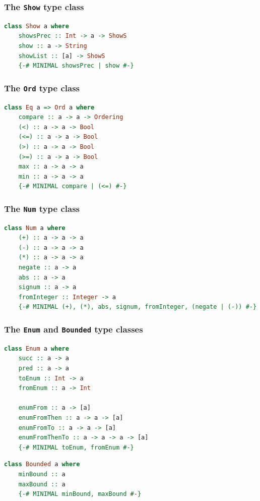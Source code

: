 \documentclass[10pt,pdf,utf8,russian,aspectratio=169]{beamer}
\begin{document}
\begin{frame}[fragile]
  \frametitle{The \verb"Show" type class}

  \begin{lstlisting}[language=Haskell]
  class Show a where
    showsPrec :: Int -> a -> ShowS
    show :: a -> String
    showList :: [a] -> ShowS
    {-# MINIMAL showsPrec | show #-}
  \end{lstlisting}
\end{frame}

\begin{frame}[fragile]
  \frametitle{The \verb"Ord" type class}

  \begin{lstlisting}[language=Haskell]
  class Eq a => Ord a where
    compare :: a -> a -> Ordering
    (<) :: a -> a -> Bool
    (<=) :: a -> a -> Bool
    (>) :: a -> a -> Bool
    (>=) :: a -> a -> Bool
    max :: a -> a -> a
    min :: a -> a -> a
    {-# MINIMAL compare | (<=) #-}
  \end{lstlisting}
\end{frame}

\begin{frame}[fragile]
  \frametitle{The \verb"Num" type class}

  \begin{lstlisting}[language=Haskell]
  class Num a where
    (+) :: a -> a -> a
    (-) :: a -> a -> a
    (*) :: a -> a -> a
    negate :: a -> a
    abs :: a -> a
    signum :: a -> a
    fromInteger :: Integer -> a
    {-# MINIMAL (+), (*), abs, signum, fromInteger, (negate | (-)) #-}
  \end{lstlisting}
\end{frame}

\begin{frame}[fragile]
  \frametitle{The \verb"Enum" and \verb"Bounded" type classes}

\begin{lstlisting}[language=Haskell]
  class Enum a where
    succ :: a -> a
    pred :: a -> a
    toEnum :: Int -> a
    fromEnum :: a -> Int

    enumFrom :: a -> [a]
    enumFromThen :: a -> a -> [a]
    enumFromTo :: a -> a -> [a]
    enumFromThenTo :: a -> a -> a -> [a]
    {-# MINIMAL toEnum, fromEnum #-}
  \end{lstlisting}

\begin{lstlisting}[language=Haskell]
  class Bounded a where
    minBound :: a
    maxBound :: a
    {-# MINIMAL minBound, maxBound #-}
  \end{lstlisting}
\end{frame}
\end{document}
